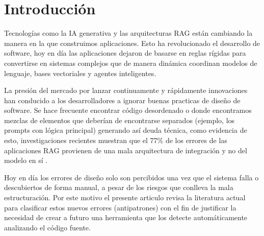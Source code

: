 \section{Introducción}

Tecnologías como la IA generativa y las arquitecturas RAG están cambiando la manera en la que construimos aplicaciones. Esto ha revolucionado el desarrollo de software, hoy en día las aplicaciones dejaron de basarse en reglas rígidas para convertirse en sistemas complejos que de manera dinámica coordinan modelos de lenguaje, bases vectoriales y agentes inteligentes.

La presión del mercado por lanzar continuamente y rápidamente innovaciones han conducido a los desarrolladores a ignorar buenas practicas de diseño de software. Se hace frecuente encontrar código desordenado o donde encontramos mezclas de elementos que deberían de encontrarse separados (ejemplo, los prompts con lógica principal) generando así deuda técnica, como evidencia de esto, investigaciones recientes muestran que el 77\% de los errores de las aplicaciones RAG provienen de una mala arquitectura de integración y no del modelo en sí \cite{shao_are_2024}. 

Hoy en día los errores de diseño solo son percibidos una vez que el sistema falla o descubiertos de forma manual, a pesar de los riesgos que conlleva la mala estructuración. Por este motivo el presente articulo revisa la literatura actual para clasificar estos nuevos errores (antipatrones) con el fin de justificar la necesidad de crear a futuro una herramienta que los detecte automáticamente analizando el código fuente.